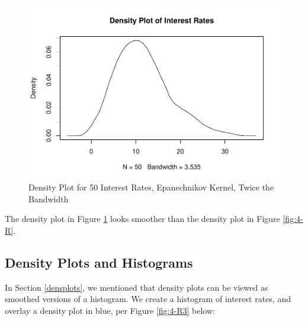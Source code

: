 \documentclass[
]{book}
\newenvironment{Shaded}{\begin{snugshade}}{\end{snugshade}}
\newcommand{\AttributeTok}[1]{\textcolor[rgb]{0.13,0.29,0.53}{#1}}
\newcommand{\ConstantTok}[1]{\textcolor[rgb]{0.56,0.35,0.01}{#1}}
\newcommand{\DocumentationTok}[1]{\textcolor[rgb]{0.56,0.35,0.01}{\textbf{\textit{#1}}}}
\newcommand{\FunctionTok}[1]{\textcolor[rgb]{0.13,0.29,0.53}{\textbf{#1}}}
\newcommand{\NormalTok}[1]{#1}
\newcommand{\SpecialCharTok}[1]{\textcolor[rgb]{0.81,0.36,0.00}{\textbf{#1}}}
\newcommand{\StringTok}[1]{\textcolor[rgb]{0.31,0.60,0.02}{#1}}
\begin{document}
\begin{figure}
\centering
\includegraphics{bookdown-demo_files/figure-latex/4-R2-1.pdf}
\caption{\label{fig:4-R2}Density Plot for 50 Interest Rates, Epanechnikov Kernel, Twice the Bandwidth}
\end{figure}

The density plot in Figure \ref{fig:4-R2} looks smoother than the density plot in Figure \ref{fig:4-R}.

\hypertarget{density-plots-and-histograms}{%
\subsection{Density Plots and Histograms}\label{density-plots-and-histograms}}

In Section \ref{densplots}, we mentioned that density plots can be viewed as smoothed versions of a histogram. We create a histogram of interest rates, and overlay a density plot in blue, per Figure \ref{fig:4-R3} below:

\begin{Shaded}
\end{Shaded}
\end{document}
